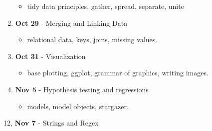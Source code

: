\documentclass[]{book}
\providecommand{\tightlist}{%
  \setlength{\itemsep}{0pt}\setlength{\parskip}{0pt}}
\begin{document}
\begin{enumerate}
  \begin{itemize}
  \tightlist
  \item
    tidy data principles, gather, spread, separate, unite
  \end{itemize}
\item
  \textbf{Oct 29} - Merging and Linking Data

  \begin{itemize}
  \tightlist
  \item
    relational data, keys, joins, missing values.
  \end{itemize}
\item
  \textbf{Oct 31} - Visualization

  \begin{itemize}
  \tightlist
  \item
    base plotting, ggplot, grammar of graphics, writing images.
  \end{itemize}
\item
  \textbf{Nov 5} - Hypothesis testing and regressions

  \begin{itemize}
  \tightlist
  \item
    models, model objects, stargazer.
  \end{itemize}
\end{enumerate}

12, \textbf{Nov 7} - Strings and Regex
\end{document}
